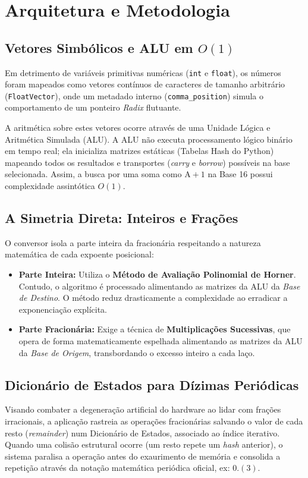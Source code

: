 \documentclass[12pt,a4paper]{article}
\begin{document}
\section{Arquitetura e Metodologia}

\subsection{Vetores Simbólicos e ALU em $O(1)$}
Em detrimento de variáveis primitivas numéricas (\texttt{int} e \texttt{float}), os números foram mapeados como vetores contínuos de caracteres de tamanho arbitrário (\texttt{FloatVector}), onde um metadado interno (\texttt{comma\_position}) simula o comportamento de um ponteiro \textit{Radix} flutuante.

A aritmética sobre estes vetores ocorre através de uma Unidade Lógica e Aritmética Simulada (ALU). A ALU não executa processamento lógico binário em tempo real; ela inicializa matrizes estáticas (Tabelas Hash do Python) mapeando todos os resultados e transportes (\textit{carry} e \textit{borrow}) possíveis na base selecionada. Assim, a busca por uma soma como $\text{A} + 1$ na Base 16 possui complexidade assintótica $O(1)$.

\subsection{A Simetria Direta: Inteiros e Frações}
O conversor isola a parte inteira da fracionária respeitando a natureza matemática de cada expoente posicional:
\begin{itemize}
    \item \textbf{Parte Inteira:} Utiliza o \textbf{Método de Avaliação Polinomial de Horner}. Contudo, o algoritmo é processado alimentando as matrizes da ALU da \textit{Base de Destino}. O método reduz drasticamente a complexidade ao erradicar a exponenciação explícita.
    \item \textbf{Parte Fracionária:} Exige a técnica de \textbf{Multiplicações Sucessivas}, que opera de forma matematicamente espelhada alimentando as matrizes da ALU da \textit{Base de Origem}, transbordando o excesso inteiro a cada laço.
\end{itemize}

\subsection{Dicionário de Estados para Dízimas Periódicas}
Visando combater a degeneração artificial do hardware ao lidar com frações irracionais, a aplicação rastreia as operações fracionárias salvando o valor de cada resto (\textit{remainder}) num Dicionário de Estados, associado ao índice iterativo. Quando uma colisão estrutural ocorre (um resto repete um \textit{hash} anterior), o sistema paralisa a operação antes do exaurimento de memória e consolida a repetição através da notação matemática periódica oficial, ex: $0.(3)$.
\end{document}
